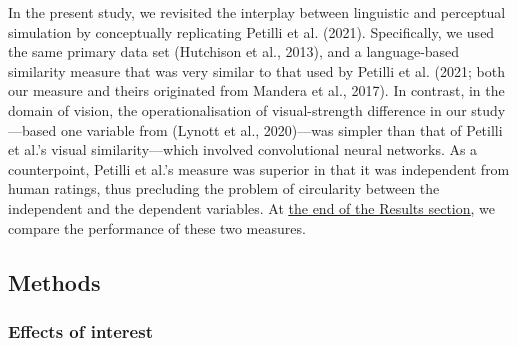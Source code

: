 \documentclass[
  12pt,
  man,floatsintext]{apa7}
\begin{document}
In the present study, we revisited the interplay between linguistic and perceptual simulation by conceptually replicating Petilli et al. (2021). Specifically, we used the same primary data set (Hutchison et al., 2013), and a language-based similarity measure that was very similar to that used by Petilli et al. (2021; both our measure and theirs originated from Mandera et al., 2017). In contrast, in the domain of vision, the operationalisation of visual-strength difference in our study---based one variable from (Lynott et al., 2020)---was simpler than that of Petilli et al.'s visual similarity---which involved convolutional neural networks. As a counterpoint, Petilli et al.'s measure was superior in that it was independent from human ratings, thus precluding the problem of circularity between the independent and the dependent variables. At \protect\hyperlink{comparing-two-measures-of-vision-based-information}{\underline{the end of the Results section}}, we compare the performance of these two measures.

\hypertarget{methods-1}{%
\subsection{Methods}\label{methods-1}}

\hypertarget{effects-of-interest}{%
\subsubsection{Effects of interest}\label{effects-of-interest}}
\end{document}
